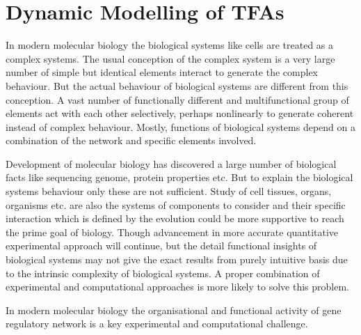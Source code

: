 
\chapter{Dynamic Modelling of TFAs} %

\label{Chapter2} %




In modern molecular biology the biological systems like cells are treated as a complex systems.
The usual conception of the complex system is a very large number of simple but identical elements 
interact to generate the complex behaviour. But the actual behaviour of biological systems are 
different from this conception. A vast number of functionally different and multifunctional 
group of elements act with each other selectively, perhaps nonlinearly to generate coherent 
instead of complex behaviour. Mostly, functions of biological systems depend on a combination of 
the network and specific elements involved. 

Development of molecular biology has discovered a large number of biological facts like sequencing 
genome, protein properties etc. But to explain the biological systems behaviour only these are not sufficient.
Study of cell tissues, organs, organisms etc. are also the systems of components to consider and 
their specific interaction which is defined by the evolution could be more supportive to reach the 
prime goal of biology. Though advancement in more accurate quantitative experimental approach will 
continue, but the detail functional insights of biological systems may not give the exact results 
from purely intuitive basis due to the intrinsic complexity of biological systems. A proper 
combination of experimental and computational approaches is more likely to solve this problem.

In modern molecular biology the organisational and functional activity of gene regulatory network 
is a key experimental and computational challenge.

